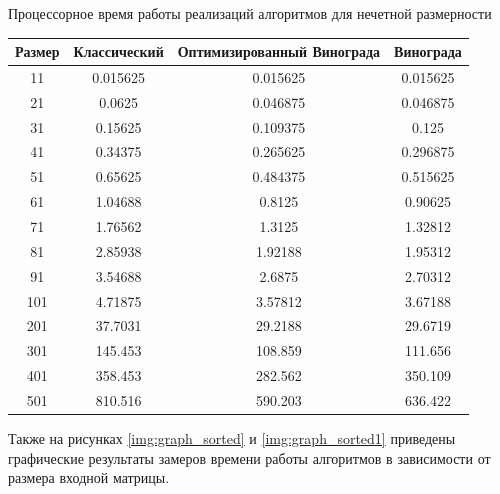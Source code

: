 \begin{center}
\begin{threeparttable}
	\end{threeparttable}
\newpage
\begin{threeparttable}
	\caption{Процессорное время работы реализаций алгоритмов для нечетной размерности}
	\label{tbl:best}
	\begin{tabular}{|c|c|c|c|}
		\hline
		Размер & Классический &  Оптимизированный Винограда  &  Винограда\\
		\hline
		11 &  0.015625 &      0.015625      & 0.015625 \\ 
		\hline
		21 &  0.0625    &   0.046875       &0.046875  \\ 
		\hline
		31 & 0.15625     &  0.109375        &  0.125  \\ 
		\hline
		41 &  0.34375     &  0.265625      & 0.296875  \\ 
		\hline
		51 & 0.65625       &0.484375      & 0.515625   \\ 
		\hline
		61 &  1.04688       &  0.8125    &    0.90625  \\ 
		\hline
		71 &  1.76562        & 1.3125   &     1.32812  \\ 
		\hline
		81 &   2.85938        &1.92188 &       1.95312 \\ 
		\hline
		91 & 3.54688   &      2.6875  &      2.70312   \\ 
		\hline
		101 & 4.71875   &     3.57812       & 3.67188  \\ 
		\hline
		201 &  37.7031   &     29.2188     &   29.6719  \\ 
		\hline
		301 & 145.453     &   108.859     &   111.656  \\ 
		\hline
		401 &  358.453     &   282.562   &     350.109 \\ 
		\hline
		501 &  810.516      &  590.203  &      636.422  \\ 
		\hline
	\end{tabular}
	
\end{threeparttable}
\end{center}

Также на рисунках \ref{img:graph_sorted} и \ref{img:graph_sorted1} приведены графические результаты замеров времени работы алгоритмов в зависимости от размера входной матрицы.

